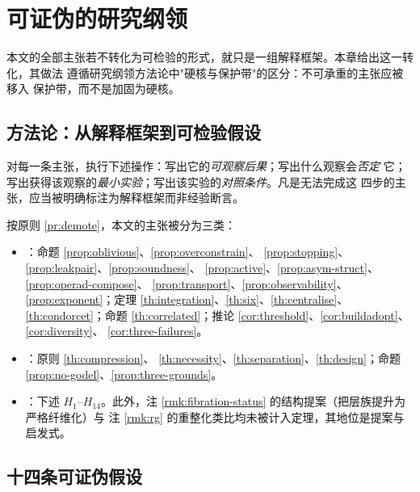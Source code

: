 \chapter[可证伪的研究纲领]{可证伪的研究纲领}\label{ch:program}

本文的全部主张若不转化为可检验的形式，就只是一组解释框架。本章给出这一转化，其做法
遵循研究纲领方法论中"硬核与保护带"的区分\cite{lakatos1970}：不可承重的主张应被移入
保护带，而不是加固为硬核。

\section{方法论：从解释框架到可检验假设}

\begin{principle}[降格程序]\label{pr:demote}
对每一条主张，执行下述操作：写出它的\emph{可观察后果}；写出什么观察会\emph{否定}
它；写出获得该观察的\emph{最小实验}；写出该实验的\emph{对照条件}。凡是无法完成这
四步的主张，应当被明确标注为解释框架而非经验断言。
\end{principle}

按原则 \ref{pr:demote}，本文的主张被分为三类：

\begin{itemize}
\item {}：命题 \ref{prop:oblivious}、\ref{prop:overconstrain}、
      \ref{prop:stopping}、\ref{prop:leakpair}、\ref{prop:soundness}、
      \ref{prop:active}、\ref{prop:asym-struct}、\ref{prop:operad-compose}、
      \ref{prop:transport}、\ref{prop:observability}、\ref{prop:exponent}；定理
      \ref{th:integration}、\ref{th:six}、\ref{th:centralise}、
      \ref{th:condorcet}；命题 \ref{th:correlated}；推论
      \ref{cor:threshold}、\ref{cor:buildadopt}、\ref{cor:diversity}、
      \ref{cor:three-failures}。
\item {}：原则 \ref{th:compression}、
      \ref{th:necessity}、\ref{th:separation}、\ref{th:design}；命题
      \ref{prop:no-godel}、\ref{prop:three-grounds}。
\item {}：下述 $H_1$--$H_{14}$。此外，注
      \ref{rmk:fibration-status} 的结构提案（把层族提升为严格纤维化）与
      注 \ref{rmk:rg} 的重整化类比均未被计入定理，其地位是提案与启发式。
\end{itemize}

\section{十四条可证伪假设}

